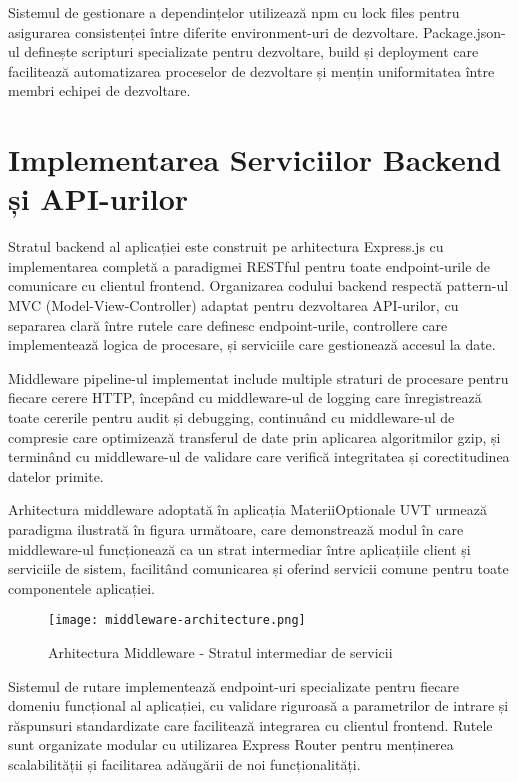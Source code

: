 \documentclass[12pt,a4paper]{report}
\begin{document}
Sistemul de gestionare a dependințelor utilizează npm cu lock files pentru asigurarea consistenței între diferite environment-uri de dezvoltare. Package.json-ul definește scripturi specializate pentru dezvoltare, build și deployment care facilitează automatizarea proceselor de dezvoltare și mențin uniformitatea între membri echipei de dezvoltare.

\section{Implementarea Serviciilor Backend și API-urilor}

Stratul backend al aplicației este construit pe arhitectura Express.js cu implementarea completă a paradigmei RESTful \cite{rest-api} pentru toate endpoint-urile de comunicare cu clientul frontend. Organizarea codului backend respectă pattern-ul MVC (Model-View-Controller) \cite{mvc-pattern} adaptat pentru dezvoltarea API-urilor, cu separarea clară între rutele care definesc endpoint-urile, controllere care implementează logica de procesare, și serviciile care gestionează accesul la date.

Middleware pipeline-ul implementat include multiple straturi de procesare pentru fiecare cerere HTTP, începând cu middleware-ul de logging care înregistrează toate cererile pentru audit și debugging, continuând cu middleware-ul de compresie care optimizează transferul de date prin aplicarea algoritmilor gzip, și terminând cu middleware-ul de validare care verifică integritatea și corectitudinea datelor primite.

Arhitectura middleware adoptată în aplicația MateriiOptionale UVT urmează paradigma ilustrată în figura următoare, care demonstrează modul în care middleware-ul funcționează ca un strat intermediar între aplicațiile client și serviciile de sistem, facilitând comunicarea și oferind servicii comune pentru toate componentele aplicației.

\begin{figure}[H]
\centering
\texttt{[image: middleware-architecture.png]}
\caption{Arhitectura Middleware - Stratul intermediar de servicii}
\label{fig:middleware-architecture}
\end{figure}

Sistemul de rutare implementează endpoint-uri specializate pentru fiecare domeniu funcțional al aplicației, cu validare riguroasă a parametrilor de intrare și răspunsuri standardizate care facilitează integrarea cu clientul frontend. Rutele sunt organizate modular cu utilizarea Express Router pentru menținerea scalabilității și facilitarea adăugării de noi funcționalități.
\end{document}
